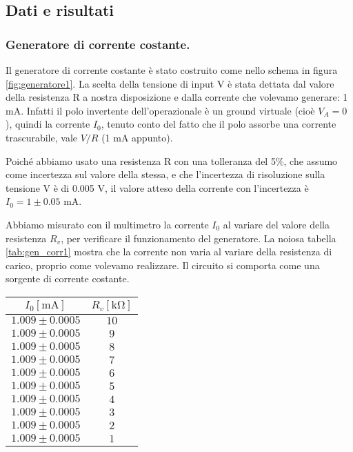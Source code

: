 \subsection{Dati e risultati}

\subsubsection{Generatore di corrente costante.}

Il generatore di corrente costante è stato costruito come nello schema in
figura \ref{fig:generatore1}. La scelta della tensione di input V è stata dettata
dal valore della resistenza R a nostra disposizione e dalla corrente che volevamo
generare: 1 mA. Infatti il polo invertente dell'operazionale è un ground virtuale
(cioè $V_A = 0$), quindi la corrente $I_0$, tenuto conto del fatto che il polo
assorbe una corrente trascurabile, vale $V/R$ (1 mA appunto). 

Poiché abbiamo usato una resistenza R con una tolleranza del 5\%,
che assumo come incertezza sul valore della stessa, e che l'incertezza di risoluzione
sulla tensione V è di 0.005 V, il valore atteso della corrente con l'incertezza è
$I_0 = 1 \pm 0.05$ mA.

Abbiamo misurato con il multimetro la corrente $I_0$ al variare del valore della
resistenza $R_v$, per verificare il funzionamento del generatore. La noiosa
tabella \ref{tab:gen_corr1} mostra che la corrente non varia al variare della resistenza
di carico, proprio come volevamo realizzare. Il circuito si comporta come
una sorgente di corrente costante.

\begin{SCtable}[1][h]
    \centering
    \begin{tabular}{c c}
        \toprule
            $I_0 [\si{\milli\ampere}]$ & $R_v [\si{\kilo\ohm}]$ \\
        \midrule
            $ 1.009 \pm 0.0005 $ & $ 10 $ \\
            $ 1.009 \pm 0.0005 $ & $ 9 $ \\
            $ 1.009 \pm 0.0005 $ & $ 8 $ \\
            $ 1.009 \pm 0.0005 $ & $ 7 $ \\
            $ 1.009 \pm 0.0005 $ & $ 6 $ \\
            $ 1.009 \pm 0.0005 $ & $ 5 $ \\
            $ 1.009 \pm 0.0005 $ & $ 4 $ \\
            $ 1.009 \pm 0.0005 $ & $ 3 $ \\
            $ 1.009 \pm 0.0005 $ & $ 2 $ \\
            $ 1.009 \pm 0.0005 $ & $ 1 $ \\
        \bottomrule
    \end{tabular}
    \caption{La corrente nel circuito \ref{fig:generatore1} rimane costante
        al variare della resistenza di carico $R_v$. Le incertezze riportare sul
        valore di corrente sono incertezze di risoluzione del multimetro
        (metà della risoluzione), mentre sui valori di resistenza non sono riportate
        perchè non rilevanti (sono comunque dell'ordine di qualche ohm).}
    \label{tab:gen_corr1}
\end{SCtable}

